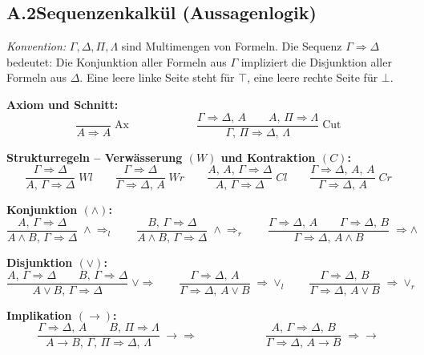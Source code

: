 \subsection*{A.2\quad Sequenzenkalkül (Aussagenlogik)}

\textit{Konvention:} $\Gamma, \Delta, \Pi, \Lambda$ sind Multimengen von Formeln. Die Sequenz $\Gamma \Rightarrow \Delta$ bedeutet: Die Konjunktion aller Formeln aus $\Gamma$ impliziert die Disjunktion aller Formeln aus $\Delta$. Eine leere linke Seite steht für $\top$, eine leere rechte Seite für $\bot$.

\medskip
\noindent\textbf{Axiom und Schnitt:}
\[
\dfrac{\phantom{X}}{A \Rightarrow A}\;\mathrm{Ax}
\qquad\qquad\qquad
\dfrac{\Gamma \Rightarrow \Delta,\, A \qquad A,\, \Pi \Rightarrow \Lambda}{\Gamma,\,\Pi \Rightarrow \Delta,\,\Lambda}\;\mathrm{Cut}
\]

\medskip
\noindent\textbf{Strukturregeln -- Verwässerung $(W)$ und Kontraktion $(C)$:}
\[
\dfrac{\Gamma \Rightarrow \Delta}{A,\,\Gamma \Rightarrow \Delta}\;Wl
\qquad
\dfrac{\Gamma \Rightarrow \Delta}{\Gamma \Rightarrow \Delta,\,A}\;Wr
\qquad
\dfrac{A,\,A,\,\Gamma \Rightarrow \Delta}{A,\,\Gamma \Rightarrow \Delta}\;Cl
\qquad
\dfrac{\Gamma \Rightarrow \Delta,\,A,\,A}{\Gamma \Rightarrow \Delta,\,A}\;Cr
\]

\medskip
\noindent\textbf{Konjunktion $(\wedge)$:}
\[
\dfrac{A,\,\Gamma \Rightarrow \Delta}{A \wedge B,\,\Gamma \Rightarrow \Delta}\;\wedge\Rightarrow_l
\qquad
\dfrac{B,\,\Gamma \Rightarrow \Delta}{A \wedge B,\,\Gamma \Rightarrow \Delta}\;\wedge\Rightarrow_r
\qquad
\dfrac{\Gamma \Rightarrow \Delta,\,A \qquad \Gamma \Rightarrow \Delta,\,B}{\Gamma \Rightarrow \Delta,\,A \wedge B}\;\Rightarrow\wedge
\]

\medskip
\noindent\textbf{Disjunktion $(\vee)$:}
\[
\dfrac{A,\,\Gamma \Rightarrow \Delta \qquad B,\,\Gamma \Rightarrow \Delta}{A \vee B,\,\Gamma \Rightarrow \Delta}\;\vee\Rightarrow
\qquad
\dfrac{\Gamma \Rightarrow \Delta,\,A}{\Gamma \Rightarrow \Delta,\,A \vee B}\;\Rightarrow\vee_l
\qquad
\dfrac{\Gamma \Rightarrow \Delta,\,B}{\Gamma \Rightarrow \Delta,\,A \vee B}\;\Rightarrow\vee_r
\]

\medskip
\noindent\textbf{Implikation $(\to)$:}
\[
\dfrac{\Gamma \Rightarrow \Delta,\,A \qquad B,\,\Pi \Rightarrow \Lambda}{A \to B,\,\Gamma,\,\Pi \Rightarrow \Delta,\,\Lambda}\;\to\Rightarrow
\qquad\qquad\qquad
\dfrac{A,\,\Gamma \Rightarrow \Delta,\,B}{\Gamma \Rightarrow \Delta,\,A \to B}\;\Rightarrow\to
\]


